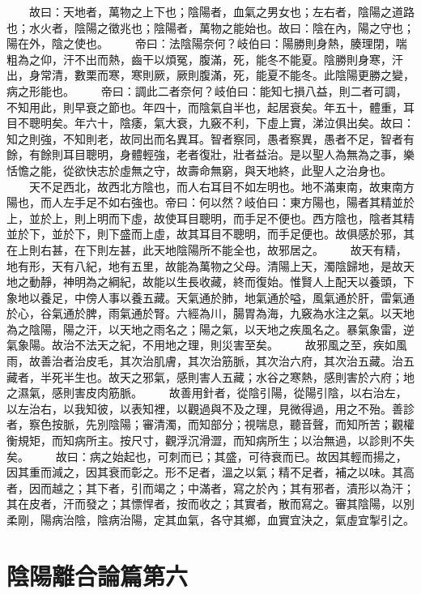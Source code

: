　　故曰：天地者，萬物之上下也；陰陽者，血氣之男女也；左右者，陰陽之道路也；水火者，陰陽之徵兆也；陰陽者，萬物之能始也。故曰：陰在內，陽之守也；陽在外，陰之使也。
　　帝曰：法陰陽奈何？岐伯曰：陽勝則身熱，腠理閉，喘粗為之仰，汗不出而熱，齒干以煩冤，腹滿，死，能冬不能夏。陰勝則身寒，汗出，身常清，數栗而寒，寒則厥，厥則腹滿，死，能夏不能冬。此陰陽更勝之變，病之形能也。
　　帝曰：調此二者奈何？岐伯曰：能知七損八益，則二者可調，不知用此，則早衰之節也。年四十，而陰氣自半也，起居衰矣。年五十，體重，耳目不聰明矣。年六十，陰痿，氣大衰，九竅不利，下虛上實，涕泣俱出矣。故曰：知之則強，不知則老，故同出而名異耳。智者察同，愚者察異，愚者不足，智者有餘，有餘則耳目聰明，身體輕強，老者復壯，壯者益治。是以聖人為無為之事，樂恬憺之能，從欲快志於虛無之守，故壽命無窮，與天地終，此聖人之治身也。
　　天不足西北，故西北方陰也，而人右耳目不如左明也。地不滿東南，故東南方陽也，而人左手足不如右強也。帝曰：何以然？岐伯曰：東方陽也，陽者其精並於上，並於上，則上明而下虛，故使耳目聰明，而手足不便也。西方陰也，陰者其精並於下，並於下，則下盛而上虛，故其耳目不聰明，而手足便也。故俱感於邪，其在上則右甚，在下則左甚，此天地陰陽所不能全也，故邪居之。
　　故天有精，地有形，天有八紀，地有五里，故能為萬物之父母。清陽上天，濁陰歸地，是故天地之動靜，神明為之綱紀，故能以生長收藏，終而復始。惟賢人上配天以養頭，下象地以養足，中傍人事以養五藏。天氣通於肺，地氣通於嗌，風氣通於肝，雷氣通於心，谷氣通於脾，雨氣通於腎。六經為川，腸胃為海，九竅為水注之氣。以天地為之陰陽，陽之汗，以天地之雨名之；陽之氣，以天地之疾風名之。暴氣象雷，逆氣象陽。故治不法天之紀，不用地之理，則災害至矣。
　　故邪風之至，疾如風雨，故善治者治皮毛，其次治肌膚，其次治筋脈，其次治六府，其次治五藏。治五藏者，半死半生也。故天之邪氣，感則害人五藏；水谷之寒熱，感則害於六府；地之濕氣，感則害皮肉筋脈。
　　故善用針者，從陰引陽，從陽引陰，以右治左，以左治右，以我知彼，以表知裡，以觀過與不及之理，見微得過，用之不殆。善診者，察色按脈，先別陰陽；審清濁，而知部分；視喘息，聽音聲，而知所苦；觀權衡規矩，而知病所主。按尺寸，觀浮沉滑澀，而知病所生；以治無過，以診則不失矣。
　　故曰：病之始起也，可刺而已；其盛，可待衰而已。故因其輕而揚之，因其重而減之，因其衰而彰之。形不足者，溫之以氣；精不足者，補之以味。其高者，因而越之；其下者，引而竭之；中滿者，寫之於內；其有邪者，漬形以為汗；其在皮者，汗而發之；其慓悍者，按而收之；其實者，散而寫之。審其陰陽，以別柔剛，陽病治陰，陰病治陽，定其血氣，各守其鄉，血實宜決之，氣虛宜掣引之。

\section{陰陽離合論篇第六}

